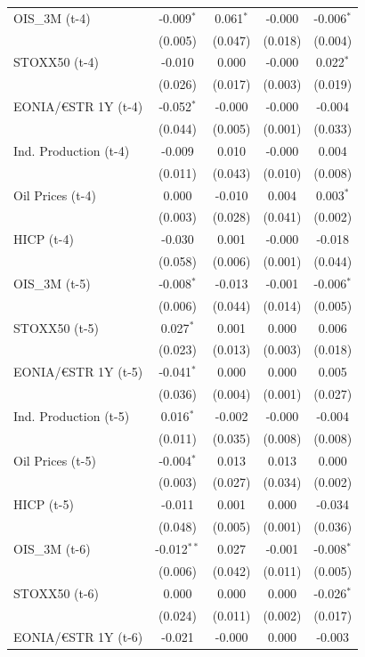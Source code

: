 \begin{longtable}[t]{lcccc}
OIS\_3M (t-4) & -0.009$^{*}$ & 0.061$^{*}$ & -0.000 & -0.006$^{*}$\\
 & (0.005) & (0.047) & (0.018) & (0.004)\\
STOXX50 (t-4) & -0.010 & 0.000 & -0.000 & 0.022$^{*}$\\
 & (0.026) & (0.017) & (0.003) & (0.019)\\
EONIA/€STR 1Y (t-4) & -0.052$^{*}$ & -0.000 & -0.000 & -0.004\\
 & (0.044) & (0.005) & (0.001) & (0.033)\\
Ind. Production (t-4) & -0.009 & 0.010 & -0.000 & 0.004\\
 & (0.011) & (0.043) & (0.010) & (0.008)\\
Oil Prices (t-4) & 0.000 & -0.010 & 0.004 & 0.003$^{*}$\\
 & (0.003) & (0.028) & (0.041) & (0.002)\\
HICP (t-4) & -0.030 & 0.001 & -0.000 & -0.018\\
 & (0.058) & (0.006) & (0.001) & (0.044)\\
OIS\_3M (t-5) & -0.008$^{*}$ & -0.013 & -0.001 & -0.006$^{*}$\\
 & (0.006) & (0.044) & (0.014) & (0.005)\\
STOXX50 (t-5) & 0.027$^{*}$ & 0.001 & 0.000 & 0.006\\
 & (0.023) & (0.013) & (0.003) & (0.018)\\
EONIA/€STR 1Y (t-5) & -0.041$^{*}$ & 0.000 & 0.000 & 0.005\\
 & (0.036) & (0.004) & (0.001) & (0.027)\\
Ind. Production (t-5) & 0.016$^{*}$ & -0.002 & -0.000 & -0.004\\
 & (0.011) & (0.035) & (0.008) & (0.008)\\
Oil Prices (t-5) & -0.004$^{*}$ & 0.013 & 0.013 & 0.000\\
 & (0.003) & (0.027) & (0.034) & (0.002)\\
HICP (t-5) & -0.011 & 0.001 & 0.000 & -0.034\\
 & (0.048) & (0.005) & (0.001) & (0.036)\\
OIS\_3M (t-6) & -0.012$^{**}$ & 0.027 & -0.001 & -0.008$^{*}$\\
 & (0.006) & (0.042) & (0.011) & (0.005)\\
STOXX50 (t-6) & 0.000 & 0.000 & 0.000 & -0.026$^{*}$\\
 & (0.024) & (0.011) & (0.002) & (0.017)\\
EONIA/€STR 1Y (t-6) & -0.021 & -0.000 & 0.000 & -0.003\\

\end{longtable}
